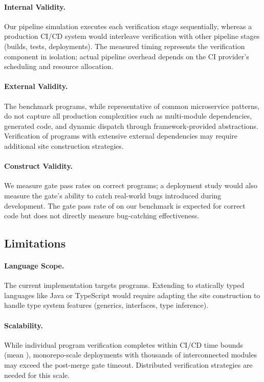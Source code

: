 \documentclass[11pt]{article}
\begin{document}
\paragraph{Internal Validity.}
Our pipeline simulation executes each verification stage sequentially,
whereas a production CI/CD system would interleave verification with other
pipeline stages (builds, tests, deployments). The measured timing represents
the verification component in isolation; actual pipeline overhead depends on
the CI provider's scheduling and resource allocation.

\paragraph{External Validity.}
The \ppLXVprogramCount{} benchmark programs, while representative of common
microservice patterns, do not capture all production complexities such as
multi-module dependencies, generated code, and dynamic dispatch through
framework-provided abstractions. Verification of programs with extensive
external dependencies may require additional site construction strategies.

\paragraph{Construct Validity.}
We measure gate pass rates on correct programs; a deployment study would
also measure the gate's ability to catch real-world bugs introduced during
development. The gate pass rate of \ppLXVgatePrePassPct{} on our benchmark
is expected for correct code but does not directly measure bug-catching
effectiveness.

\subsection{Limitations}

\paragraph{Language Scope.}
The current implementation targets \Python{} programs. Extending to
statically typed languages like Java or TypeScript would require adapting
the site construction to handle type system features (generics, interfaces,
type inference).

\paragraph{Scalability.}
While individual program verification completes within CI/CD time bounds
(mean \ppLXVtotalMean{}), monorepo-scale deployments with thousands of
interconnected modules may exceed the post-merge gate timeout. Distributed
verification strategies are needed for this scale.
\end{document}
